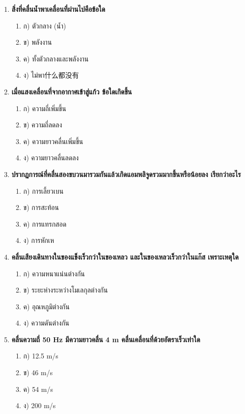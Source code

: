 \documentclass[12pt]{article}
\begin{document}
\begin{enumerate}
\begin{enumerate}
\item ค) บริเวณคงที่
\item ง) บริเวณเลี้ยวเบน
\end{enumerate}
\item \textbf{สิ่งที่คลื่นน้ำพาเคลื่อนที่ผ่านไปคือข้อใด}
\begin{enumerate}
\item ก) ตัวกลาง (น้ำ)
\item ข) พลังงาน
\item ค) ทั้งตัวกลางและพลังงาน
\item ง) ไม่พา什么都没有
\end{enumerate}
\item \textbf{เมื่อแสงเคลื่อนที่จากอากาศเข้าสู่แก้ว ข้อใดเกิดขึ้น}
\begin{enumerate}
\item ก) ความถี่เพิ่มขึ้น
\item ข) ความถี่ลดลง
\item ค) ความยาวคลื่นเพิ่มขึ้น
\item ง) ความยาวคลื่นลดลง
\end{enumerate}
\item \textbf{ปรากฏการณ์ที่คลื่นสองขบวนมารวมกันแล้วเกิดแอมพลิจูดรวมมากขึ้นหรือน้อยลง เรียกว่าอะไร}
\begin{enumerate}
\item ก) การเลี้ยวเบน
\item ข) การสะท้อน
\item ค) การแทรกสอด
\item ง) การหักเห
\end{enumerate}
\item \textbf{คลื่นเสียงเดินทางในของแข็งเร็วกว่าในของเหลว และในของเหลวเร็วกว่าในแก๊ส เพราะเหตุใด}
\begin{enumerate}
\item ก) ความหนาแน่นต่างกัน
\item ข) ระยะห่างระหว่างโมเลกุลต่างกัน
\item ค) อุณหภูมิต่างกัน
\item ง) ความดันต่างกัน
\end{enumerate}
\item \textbf{คลื่นความถี่ 50 Hz มีความยาวคลื่น 4 m คลื่นเคลื่อนที่ด้วยอัตราเร็วเท่าใด}
\begin{enumerate}
\item ก) 12.5 m/s
\item ข) 46 m/s
\item ค) 54 m/s
\item ง) 200 m/s
\end{enumerate}

\end{enumerate}
\end{document}
